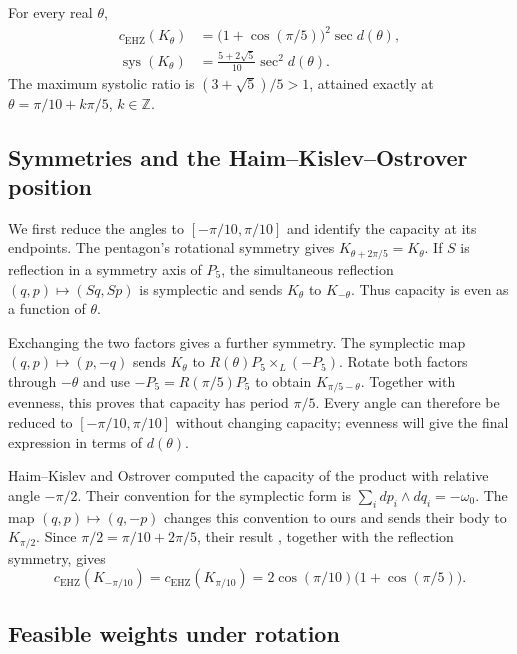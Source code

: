 \begin{theorem}
\label{thm:rotated-pentagon-product-formula}
For every real $\theta$,
\begin{align}
 c_{\mathrm{EHZ}}(K_\theta)
 &=\bigl(1+\cos(\pi/5)\bigr)^2\sec d(\theta),
 \label{eq:pentagon-capacity-profile}\\
 \operatorname{sys}(K_\theta)
 &=\frac{5+2\sqrt5}{10}\sec^2 d(\theta).
 \label{eq:pentagon-systolic-profile}
\end{align}
The maximum systolic ratio is $(3+\sqrt5)/5>1$, attained exactly at
$\theta=\pi/10+k\pi/5$, $k\in\mathbb Z$.
\end{theorem}

\subsection{Symmetries and the Haim--Kislev--Ostrover position}

We first reduce the angles to $[-\pi/10,\pi/10]$ and identify the
capacity at its endpoints. The pentagon's rotational symmetry gives
$K_{\theta+2\pi/5}=K_\theta$. If $S$ is reflection in a symmetry axis
of $P_5$, the simultaneous reflection $(q,p)\mapsto(Sq,Sp)$ is
symplectic and sends $K_\theta$ to $K_{-\theta}$. Thus capacity is even
as a function of $\theta$.

Exchanging the two factors gives a further symmetry. The symplectic map
$(q,p)\mapsto(p,-q)$ sends $K_\theta$ to
$R(\theta)P_5\times_L(-P_5)$. Rotate both factors through $-\theta$
and use $-P_5=R(\pi/5)P_5$ to obtain $K_{\pi/5-\theta}$.
Together with evenness, this proves that capacity has period $\pi/5$.
Every angle can therefore be reduced to $[-\pi/10,\pi/10]$ without
changing capacity; evenness will give the final expression in terms of
$d(\theta)$.

Haim--Kislev and Ostrover computed the capacity of the product with
relative angle $-\pi/2$. Their convention for the symplectic form is
$\sum_i dp_i\wedge dq_i=-\omega_0$. The map $(q,p)\mapsto(q,-p)$
changes this convention to ours and sends their body to $K_{\pi/2}$.
Since $\pi/2=\pi/10+2\pi/5$, their result
\cite[Proposition~1.4]{HaimKislevOstrover2024}, together with the reflection
symmetry, gives
\begin{equation}
 c_{\mathrm{EHZ}}(K_{-\pi/10})
 =c_{\mathrm{EHZ}}(K_{\pi/10})
 =2\cos(\pi/10)\bigl(1+\cos(\pi/5)\bigr).
 \label{eq:pentagon-known-endpoints}
\end{equation}

\subsection{Feasible weights under rotation}

